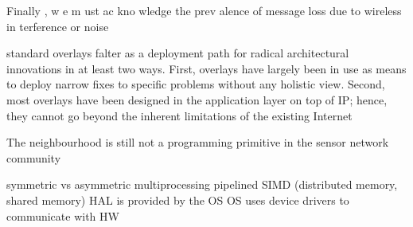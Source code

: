 Finally
,
w
e
m
ust
ac
kno
wledge
the
prev
alence
of
message
loss
due
to
wireless
in
terference
or
noise

 standard overlays falter
 as a deployment path for radical architectural innovations in
 at least two ways. First, overlays have largely been in use as
 means to deploy narrow fixes to specific problems without any
 holistic view. Second, most overlays have been designed in the
 application layer on top of IP; hence, they cannot go beyond
 the inherent limitations of the existing Internet

The neighbourhood is still not a programming primitive in the sensor network community

symmetric vs asymmetric multiprocessing
pipelined SIMD (distributed memory, shared memory)
HAL is provided by the OS
OS uses device drivers to communicate with HW

